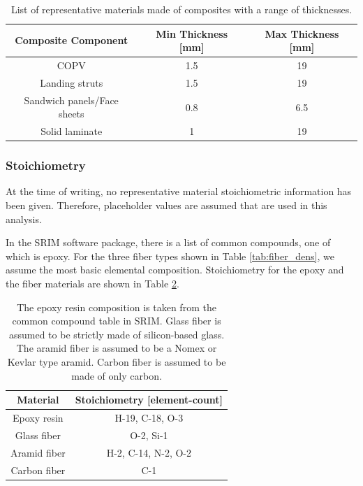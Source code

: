 \documentclass{hitec}
\begin{document}
\begin{table}[h]\centering
	\caption{List of representative materials made of composites with a range of thicknesses.}\label{tab:thickness_comp}
	\begin{tabular}{|c | c | c |}\hline
		Composite Component & Min Thickness [mm] & Max Thickness [mm] \\\hline
		COPV & 1.5 & 19 \\\hline
		Landing struts	& 1.5 & 19 \\\hline
		Sandwich panels/Face sheets	& 0.8 & 6.5 \\\hline
		Solid laminate	& 1 & 19 \\\hline	
	\end{tabular}
\end{table}

\subsubsection{Stoichiometry}

At the time of writing, no representative material stoichiometric information has been given. Therefore, placeholder values are assumed that are used in this analysis.

In the SRIM software package, there is a list of common compounds, one of which is epoxy. For the three fiber types shown in Table \ref{tab:fiber_dens}, we assume the most basic elemental composition. Stoichiometry for the epoxy and the fiber materials are shown in Table \ref{tab:stoichiometry}.

\begin{table}[h]\centering
	\caption{The epoxy resin composition is taken from the common compound table in SRIM. Glass fiber is assumed to be strictly made of silicon-based glass. The aramid fiber is assumed to be a Nomex or Kevlar type aramid. Carbon fiber is assumed to be made of only carbon.}\label{tab:stoichiometry}
	\begin{tabular}{|c | c |}\hline
		Material & Stoichiometry [element-count] \\\hline
		Epoxy resin & H-19, C-18, O-3 \\\hline
		Glass fiber & O-2, Si-1 \\\hline
		Aramid fiber & H-2, C-14, N-2, O-2  \\\hline
		Carbon fiber & C-1  \\\hline	
	\end{tabular}
\end{table}
\end{document}
